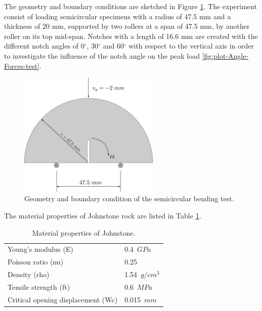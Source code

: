 \documentclass[preprint,12pt,a4paper]{elsarticle}
\begin{document}
The geometry and boundary conditions are sketched in Figure 
\ref{fig:geometry-Semicircular-bending-test}. The experiment consist of loading
semicircular specimens with a radius of 47.5 mm and a thickness of
20 mm, supported by two rollers at a span of 47.5 mm, by
another roller on its top mid-span. Notches with a length of 16.6 mm are
created with the different notch angles of 0$^{\circ}$, 30$^{\circ}$ and 60$^{\circ}$ with respect
to the vertical axis in order to investigate the influence of the
notch angle on the peak load \ref{fig:plot-Angle-Forces-test}.
\begin{figure}
  \centering
  \includegraphics[width=0.6\textwidth]{./Figure-Semicircular-bending-test}
  \caption{Geometry and boundary condition of the semicircular bending
    test.}
  \label{fig:geometry-Semicircular-bending-test}
\end{figure}
The material properties of Johnstone rock are listed in Table \ref{tab:Johnstone-properties}.
\begin{table}
  \centering
  \begin{tabular}[]{l l}
    \hline
    Young's modulus (\gls{E})   & 0.4\ $GPa$       \\
    Poisson ratio (\gls{nu})    & 0.25           \\
    Density (\gls{rho})         & 1.54\ $g/cm^3$ \\
    Tensile strength (\gls{ft}) & 0.6\ $MPa$       \\
    Critical opening displacement (\gls{Wc}) & 0.015\ $mm$ \\
    \hline
  \end{tabular}
  \caption[Mechanical properties of Johnstone. ]{Material properties of Johnstone.}
  \label{tab:Johnstone-properties}
\end{table}
\end{document}
